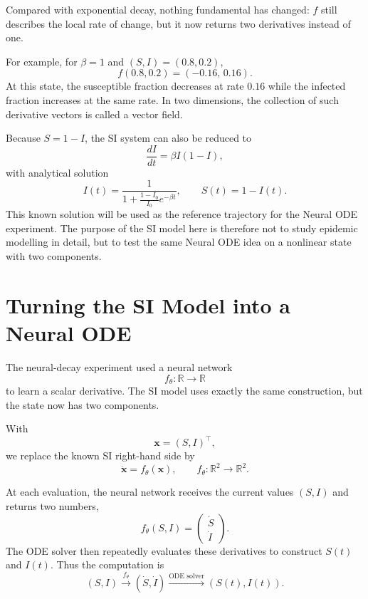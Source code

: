 \documentclass[11pt,a4paper]{article}
\begin{document}
Compared with exponential decay, nothing fundamental has changed: $f$ still
describes the local rate of change, but it now returns two derivatives instead
of one.

For example, for $\beta=1$ and $(S,I)=(0.8,0.2)$,
\[
    f(0.8,0.2)=(-0.16,\,0.16).
\]
At this state, the susceptible fraction decreases at rate $0.16$ while the
infected fraction increases at the same rate. In two dimensions, the
collection of such derivative vectors is called a vector field.

Because $S=1-I$, the SI system can also be reduced to
\[
    \frac{dI}{dt}=\beta I(1-I),
\]
with analytical solution
\begin{equation}
    I(t)=
    \frac{1}{1+\frac{1-I_0}{I_0}e^{-\beta t}},
    \qquad
    S(t)=1-I(t).
    \label{eq:si-solution}
\end{equation}
This known solution will be used as the reference trajectory for the Neural
ODE experiment. The purpose of the SI model here is therefore not to study
epidemic modelling in detail, but to test the same Neural ODE idea on a
nonlinear state with two components.

\section{Turning the SI Model into a Neural ODE}
\label{sec:si-node}

The neural-decay experiment used a neural network
\[
    f_\theta:\mathbb{R}\rightarrow\mathbb{R}
\]
to learn a scalar derivative. The SI model uses exactly the same construction,
but the state now has two components.

With
\[
    \mathbf{x}=(S,I)^\top,
\]
we replace the known SI right-hand side by
\begin{equation}
    \dot{\mathbf{x}}
    =
    f_\theta(\mathbf{x}),
    \qquad
    f_\theta:\mathbb{R}^2\rightarrow\mathbb{R}^2.
    \label{eq:si-node}
\end{equation}

At each evaluation, the neural network receives the current values $(S,I)$
and returns two numbers,
\[
    f_\theta(S,I)
    =
    \begin{pmatrix}
        \dot S\\
        \dot I
    \end{pmatrix}.
\]
The ODE solver then repeatedly evaluates these derivatives to construct
$S(t)$ and $I(t)$. Thus the computation is
\[
    (S,I)
    \xrightarrow{\,f_\theta\,}
    (\dot S,\dot I)
    \xrightarrow{\text{ODE solver}}
    (S(t),I(t)).
\]
\end{document}
